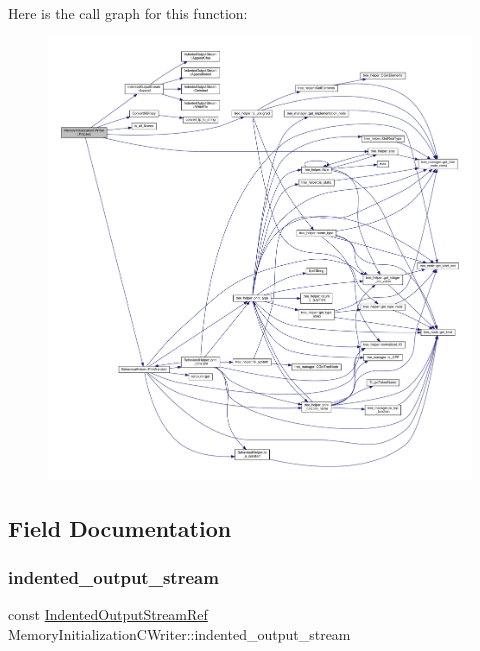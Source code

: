 Here is the call graph for this function\+:
\nopagebreak
\begin{figure}[H]
\begin{center}
\leavevmode
\includegraphics[width=350pt]{df/d21/classMemoryInitializationCWriter_a9f35397c3df92849e7f235b5da9c7bb0_cgraph}
\end{center}
\end{figure}


\subsection{Field Documentation}
\mbox{\label{classMemoryInitializationCWriter_a3c706735fead6b0299e9d4b9dcb7d983}} 
\subsubsection{\texorpdfstring{indented\+\_\+output\+\_\+stream}{indented\_output\_stream}}
{\footnotesize\ttfamily const \hyperlink{indented__output__stream_8hpp_ab32278e11151ef292759c88e99b77feb}{Indented\+Output\+Stream\+Ref} Memory\+Initialization\+C\+Writer\+::indented\+\_\+output\+\_\+stream\hspace{0.3cm}{\ttfamily [protected]}}



